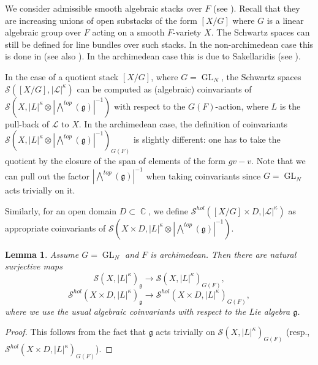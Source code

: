 \documentclass[12pt,reqno]{amsart}
\DeclareMathOperator\C{\mathbb C}
\newtheorem{lemma}[theorem]{Lemma}
\theoremstyle{definition}
\theoremstyle{remark}
\numberwithin{equation}{section}
\newcommand{\ot}{\otimes}
\renewcommand{\SS}{{\mathcal S}}
\newcommand{\LL}{{\mathcal L}}
\newcommand{\sub}{\subset}
\newcommand{\GL}{\operatorname{GL}}
\newcommand{\fg}{{\mathfrak g}}
\begin{document}
We consider admissible smooth algebraic stacks over $F$ (see \cite[Sec.\ 2.2]{BKP}).
Recall that they are increasing unions of open substacks of the form $[X/G]$ where $G$ is a linear algebraic group over $F$ acting on a smooth $F$-variety $X$.
The Schwartz spaces can still be defined for line bundles over such stacks. In the non-archimedean case this is done in \cite{GK}
(see also \cite[Sec.\ 2.2]{BKP}). In the archimedean case this is due to Sakellaridis (see \cite{Sak}).

In the case of a quotient stack $[X/G]$, where $G=\GL_N$, the Schwartz spaces $\SS([X/G],|\LL|^{\kappa})$ can be computed as (algebraic) coinvariants of 
$\SS(X,|L|^{\kappa}\ot |{\bigwedge}^{top}(\fg)|^{-1})$ with respect to the $G(F)$-action, where $L$ is the pull-back of $\LL$ to $X$.
In the archimedean case, the definition of coinvariants $\SS(X,|L|^{\kappa}\ot |{\bigwedge}^{top}(\fg)|^{-1})_{G(F)}$
is slightly different: one has to take the quotient by the closure of the span of elements of the form $gv-v$.
Note that we can pull out the factor $|{\bigwedge}^{top}(\fg)|^{-1}$ when taking coinvariants since $G=\GL_N$ acts trivially on it.

Similarly, for an open domain $D\sub \C$, we define $\SS^{hol}([X/G]\times D,|\LL|^{\kappa})$ as appropriate coinvariants
of $\SS(X\times D,|L|^{\kappa}\ot |{\bigwedge}^{top}(\fg)|^{-1})$.

\begin{lemma}\label{Lie-group-coinv-lem}
Assume $G=\GL_N$ and $F$ is archimedean. Then there are natural surjective maps
$$\SS(X,|L|^{\kappa})_{\fg}\to \SS(X,|L|^{\kappa})_{G(F)},$$
$$\SS^{hol}(X\times D,|L|^{\kappa})_{\fg}\to \SS^{hol}(X\times D,|L|^{\kappa})_{G(F)},$$
where we use the usual algebraic coinvariants with respect to the Lie algebra $\fg$.
\end{lemma}

\begin{proof}
This follows from the fact that $\fg$ acts trivially on $\SS(X,|L|^{\kappa})_{G(F)}$ (resp., $\SS^{hol}(X\times D,|L|^{\kappa})_{G(F)}$).
\end{proof}
\end{document}
